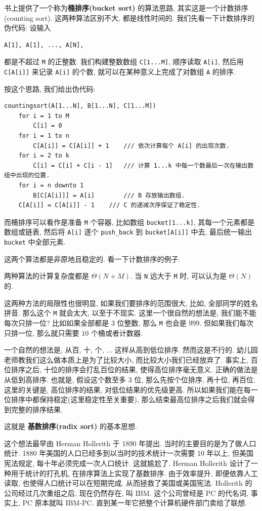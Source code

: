 \documentclass[a4paper]{ctexart}
\theoremstyle{definition}
\theoremstyle{definition}
\begin{document}
书上提供了一个称为{\bf 桶排序(bucket sort)} 的算法思路,
其实这是一个计数排序(counting sort). 这两种算法区别不大, 都是线性时间的.
我们先看一下计数排序的伪代码: 设输入
\begin{verbatim}
A[1], A[1], ..., A[N],
\end{verbatim}
都是不超过 \verb|M| 的正整数. 我们构建整数数组 \verb|C[1...M]|,
顺序读取 \verb|A[i]|, 然后用 \verb|C[A[i]]| 来记录 \verb|A[i]| 的个数,
就可以在某种意义上完成了对数组 \verb|A| 的排序.

按这个思路, 我们给出伪代码:

\begin{verbatim}
countingsort(A[1...N], B[1...N], C[1...M])
    for i = 1 to M
        C[i] = 0
    for i = 1 to n
        C[A[i]] = C[A[i]] + 1    /// 依次计算每个 A[i] 的出现次数.
    for i = 2 to k
        C[i] = C[i] + C[i - 1]   /// 计算 1...k 中每一个数最后一次在输出数组中出现的位置.
    for i = n downto 1
        B[C[A[i]]] = A[i]        /// B 存放输出数组.
	C[A[i]] = C[A[i]] - 1    /// C 的递减次序保证了稳定性.
\end{verbatim}
而桶排序可以看作是准备 \verb|M| 个容器, 比如数组 \verb|bucket[1...k]|,
其每一个元素都是数组或链表, 然后将 \verb|A[i]| 逐个 \verb|push_back|
到 \verb|bucket[A[i]]| 中去, 最后统一输出 \verb|bucket| 中全部元素. 

这两个算法都是非原地且稳定的. 看一下计数排序的例子. 

两种算法的计算复杂度都是 $\Theta(N + M)$. 当 \verb|N| 远大于 \verb|M| 时,
可以认为是 $\Theta(N)$ 的.

这两种方法的局限性也很明显, 如果我们要排序的范围很大, 比如,
全部同学的姓名拼音. 那么这个 \verb|M| 就会太大, 以至于不现实.
这里一个很自然的想法是, 我们能不能每次只排一位? 比如如果全部都是 $3$ 位整数,
那么 \verb|M| 也会是 $999$. 但如果我们每次只排一位,
那么就只需要 $10$ 个桶或者计数器. 

一个自然的想法是, 从百, 十, 个, ... 这样从高到低位排序. 然而这是不行的.
幼儿园老师教我们这么做本质上是为了比较大小, 而比较大小我们已经放弃了.
事实上, 百位排序之后, 十位的排序会打乱百位的结果, 使得高位排序毫无意义.
正确的做法是从低到高排序. 也就是, 假设这个数至多 3 位, 那么先按个位排序,
再十位, 再百位. 这里的关键是, 高位排序的结果, 对低位结果的优先级更高.
所以如果我们能在每一位排序中都保持稳定(这里稳定性至关重要),
那么结束最高位排序之后我们就会得到完整的排序结果.


这就是 {\bf 基数排序(radix sort)} 的基本思想.

这个想法最早由 Herman Hollerith 于 1890 年提出.
当时的主要目的是为了做人口统计.
1880 年美国的人口已经多到以当时的技术统计一次需要 10 年以上, 但美国宪法规定,
每十年必须完成一次人口统计. 这就尴尬了. Herman Hollerith 设计了一种用于统计的打孔机,
在排序算法上实现了基数排序. 由于效率提升, 即便依靠人工读取, 也使得人口统计可以在短期完成.
从而拯救了美国或美国宪法. Hollerith 的公司经过几次重组之后, 现在仍然存在,
叫 IBM. 这个公司曾经是 PC 的代名词, 事实上, PC 原本就叫 IBM-PC.
直到某一年它把整个计算机硬件部门卖给了联想. 
\end{document}
